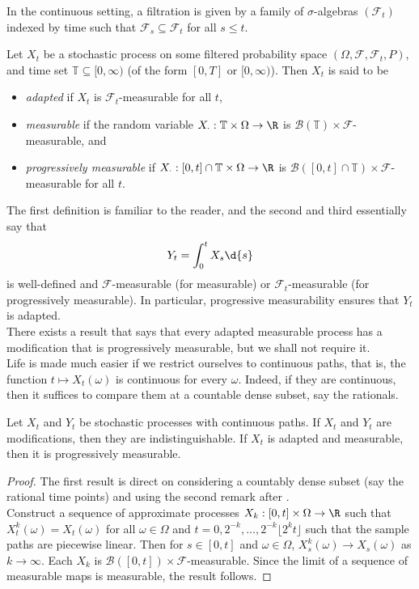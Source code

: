 		In the continuous setting, a filtration is given by a family of $\sigma$-algebras $(\mathcal{F}_t)$ indexed by time such that $\mathcal{F}_s \subseteq \mathcal{F}_t$ for all $s\leq t$.

		\begin{definition}
			Let $X_t$ be a stochastic process on some filtered probability space $(\Omega,\mathcal{F},\mathcal{F}_t,P)$, and time set $\mathbb{T}\subseteq[0,\infty)$ (of the form $[0,T]$ or $[0,\infty)$). Then $X_t$ is said to be 
			\begin{itemize}
				\item \textit{adapted} if $X_t$ is $\mathcal{F}_t$-measurable for all $t$,
				\item \textit{measurable} if the random variable $X_{\cdot}:\mathbb{T}\times\Omega\to\R$ is $\mathcal{B}(\mathbb{T})\times\mathcal{F}$-measurable, and
				\item \textit{progressively measurable} if $X_{\cdot}:[0,t]\cap\mathbb{T}\times\Omega\to\R$ is $\mathcal{B}([0,t]\cap\mathbb{T})\times\mathcal{F}$-measurable for all $t$.
			\end{itemize}
		\end{definition}

		The first definition is familiar to the reader, and the second and third essentially say that
		\[ Y_t = \int_0^t X_s\d{s} \]
		is well-defined and $\mathcal{F}$-measurable (for measurable) or $\mathcal{F}_t$-measurable (for progressively measurable). In particular, progressive measurability ensures that $Y_t$ is adapted.\\
		There exists a result that says that every adapted measurable process has a modification that is progressively measurable, but we shall not require it.\\

		Life is made much easier if we restrict ourselves to continuous paths, that is, the function $t\mapsto X_t(\omega)$ is continuous for every $\omega$. Indeed, if they are continuous, then it suffices to compare them at a countable dense subset, say the rationals.

		\begin{lemma}
			Let $X_t$ and $Y_t$ be stochastic processes with continuous paths. If $X_t$ and $Y_t$ are modifications, then they are indistinguishable. If $X_t$ is adapted and measurable, then it is progressively measurable.
		\end{lemma}
		\begin{proof}
			The first result is direct on considering a countably dense subset (say the rational time points) and using the second remark after .\\
			Construct a sequence of approximate processes $X_k : [0,t]\times\Omega\to\R$ such that $X_t^k(\omega)=X_t(\omega)$ for all $\omega\in\Omega$ and $t=0,2^{-k},\ldots,2^{-k}\lfloor 2^k t\rfloor$ such that the sample paths are piecewise linear. Then for $s\in[0,t]$ and $\omega\in\Omega$, $X_s^k(\omega)\to X_s(\omega)$ as $k\to\infty$. Each $X_k$ is $\mathcal{B}([0,t])\times\mathcal{F}$-measurable. Since the limit of a sequence of measurable maps is measurable, the result follows.
		\end{proof}

